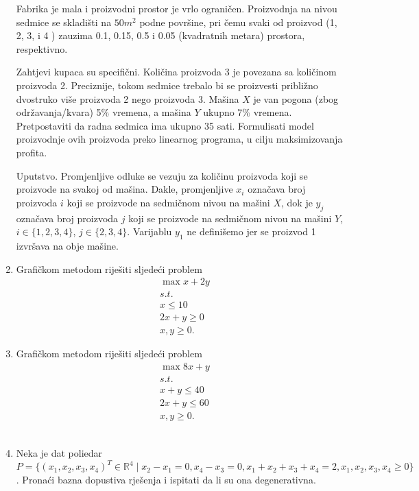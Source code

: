 \documentclass[a4paper, utf8, 11pt, colorlinks]{book}
\theoremstyle{definition}
\begin{document}
\begin{enumerate}
Fabrika je  mala i proizvodni prostor je vrlo ograničen. Proizvodnja na nivou sedmice se skladišti na $50 m^2$ podne površine, pri čemu svaki od proizvod (1, 2, 3, i 4 ) zauzima 0.1, 0.15, 0.5 i 0.05 (kvadratnih metara) prostora,  respektivno. 

Zahtjevi kupaca su specifični. Količina proizvoda 3 je povezana sa količinom  proizvoda 2. Preciznije, tokom sedmice trebalo bi se proizvesti približno dvostruko više  proizvoda 2 nego proizvoda 3. Mašina $X$ je van pogona (zbog održavanja/kvara) 5\% vremena, a mašina $Y$ ukupno 7\% vremena.
Pretpostaviti da radna sedmica ima ukupno 35 sati. Formulisati model proizvodnje ovih proizvoda preko linearnog programa, u cilju maksimizovanja profita. 

Uputstvo. Promjenljive odluke se vezuju za količinu proizvoda koji se proizvode na svakoj od mašina.  Dakle, 
promjenljive $x_i$ označava broj proizvoda $i$ koji se proizvode na sedmičnom nivou na mašini $X$, dok je $y_j$ označava  broj proizvoda $j$ koji se proizvode na sedmičnom nivou na mašini $Y$, $i \in \{1,2,3,4\}$, $j \in \{2,3,4\}$. Varijablu $y_1$ ne definišemo jer se proizvod 1 izvršava na obje mašine.  

	\item Grafičkom metodom riješiti sljedeći problem
	\begin{align*}
		&\max   x + 2 y \\
		& s.t. \\
		& x \leq 10 \\
		& 2 x + y\geq 0 \\
		& x,y \geq 0.
	\end{align*}
	\item Grafičkom metodom riješiti sljedeći problem 
	\begin{align*}
		& \max  8 x + y \\
		& s.t. \\
		&  x + y \leq 40 \\
		& 2x + y \leq 60 \\
		& x,y \geq 0.
	\end{align*}
\\

\item Neka je dat poliedar $P= \{ (x_1,x_2,x_3, x_4)^T \in \mathbb{R}^4 \mid x_2 - x_1 = 0, x_4 - x_3 = 0,  x_1 + x_2 +   x_3 + x_4 = 2, x_1,x_2,x_3, x_4 \geq 0 \}$.  Pronaći bazna dopustiva rješenja i ispitati da li su ona degenerativna.  
  
\end{enumerate}
\end{document}
